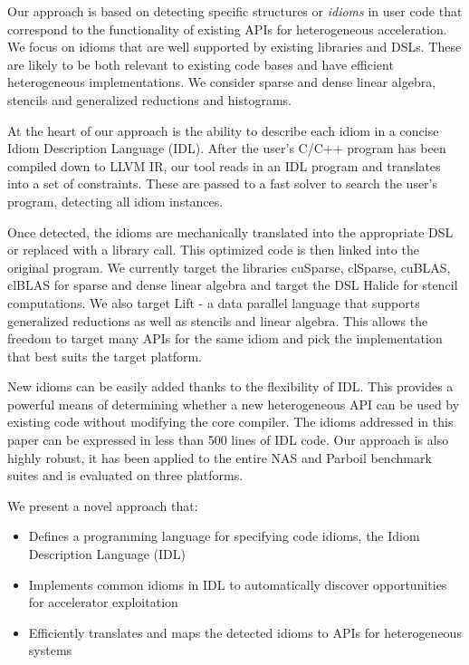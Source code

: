     Our approach is based on detecting specific structures or {\em idioms} in
    user code that correspond to the functionality of existing APIs for
    heterogeneous acceleration.
    We focus on idioms that are well supported by existing libraries and DSLs.
    These are likely to be both relevant to existing code bases and have
    efficient heterogeneous implementations.
    We consider sparse and dense linear algebra, stencils and generalized
    reductions and histograms.

    At the heart of our approach is the ability to describe each idiom in a
    concise Idiom Description Language (IDL).
    After the user's C/C++ program has been compiled down to LLVM IR, our tool
    reads in an IDL program and translates into a set of constraints.
    These are passed to a fast solver to search the user's program, detecting
    all idiom instances.

    Once detected, the idioms are mechanically translated into the appropriate
    DSL or replaced with a library call.
    This optimized code is then linked into the original program.
    We currently target the libraries cuSparse, clSparse, cuBLAS, clBLAS for
    sparse and dense linear algebra and target the DSL Halide
    \cite{Ragan-Kelley2013Halide} for stencil computations.
    We also target Lift \cite{SteuwerRD17} - a data parallel language that
    supports generalized reductions as well as stencils and linear algebra.
    This allows the freedom to target many APIs for the same idiom and pick the
    implementation that best suits the target platform. 

    New idioms can be easily added thanks to the flexibility of IDL.
    This provides a powerful means of determining whether a new heterogeneous
    API can be used by existing code without modifying the core compiler.
    The idioms addressed in this paper can be expressed in less than 500 lines
    of IDL code.
    Our approach is also highly robust, it has been applied to the entire NAS
    and Parboil benchmark suites and is evaluated on three platforms.

    We present a novel approach that:
    \begin{itemize}
    \item Defines a programming language for specifying code idioms, the Idiom
          Description Language (IDL)\\[-.9em]
    \item Implements common idioms in IDL to automatically discover
          opportunities for accelerator exploitation\\[-.9em]
    \item Efficiently translates and maps the detected idioms to APIs for
          heterogeneous systems
    \end{itemize}

